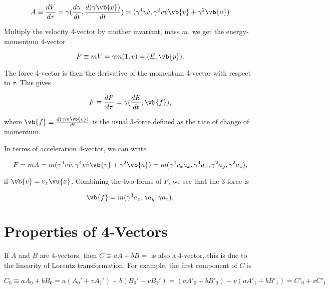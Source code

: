 \documentclass[english,a4paper,12pt]{report}
\begin{document}
\begin{equation}
    A \equiv  \frac{dV}{d\tau } = \gamma (\frac{d\gamma }{dt}, \frac{d(\gamma \vb{v} )}{dt}) = (\gamma ^{4}v \dot{v} , \gamma ^{4} v \dot{v} \vb{v} + \gamma ^2 \vb{a})
\end{equation}

Multiply the velocity 4-vector by another invariant, mass \(m\), we get the energy-momentum 4-vector

\begin{equation}
    P \equiv mV = \gamma m(1,v) = (E, \vb{p} ). 
\end{equation}

The force 4-vector is then the derivative of the momentum 4-vector with respect to \(\tau \). This gives

\begin{equation}
    F \equiv \frac{dP}{d\tau } = \gamma (\frac{dE}{dt}, \vb{f}),
\end{equation}

where \(\vb{f} \equiv \frac{d(\gamma m\vb{v} )}{dt} \) is the usual 3-force defined as the rate of change of momentum.  

In terms of acceleration 4-vector, we can write 

\begin{equation}
    F = mA = m(\gamma ^{4}v \dot{v} , \gamma ^{4} v \dot{v} \vb{v}  + \gamma ^2 \vb{a}  ) = m(\gamma ^{4} v_{x} a_{x}, \gamma ^{4} a_{x}, \gamma ^2 a_{y}, \gamma ^2 a_{z}),
\end{equation}

if \(\vb{v} = v_{x}\vu{x}  \). Combining the two forms of \(F\), we see that the 3-force is

\begin{equation}
    \vb{f} = m(\gamma ^3 a_{x}, \gamma a_{y}, \gamma a_{z}).
\end{equation}

\section{Properties of 4-Vectors}

If \(A\) and \(B\) are 4-vectors, then \(C \equiv aA + bB = \) is also a 4-vector, this is due to the linearity of Lorentz transformation. For example, the first component of \(C\) is

\begin{equation}
    C_0 \equiv aA_0 + bB_0  = a(A_0 ' + v A_1 ') + b(B_0 ' + vB_1 ') = (aA'_{0} + b B'_{0}) + v(aA'_{1} + bB'_{1}  ) = C'_{0} + vC'_{1}  
\end{equation}
\end{document}
